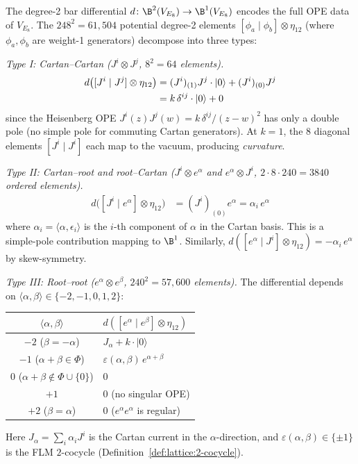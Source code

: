 \begin{computation}
\label{comp:E8-bar-deg2}
The degree-2 bar differential $d\colon \B^2(V_{E_8}) \to \B^1(V_{E_8})$
encodes the full OPE data of $V_{E_8}$. The $248^2 = 61{,}504$
potential degree-2 elements $[\phi_a \mid \phi_b] \otimes \eta_{12}$
(where $\phi_a, \phi_b$ are weight-1 generators) decompose into
three types:

\emph{Type I: Cartan--Cartan ($J^i \otimes J^j$, $8^2 = 64$ elements).}
\begin{align}
d\bigl([J^i \mid J^j] \otimes \eta_{12}\bigr)
&= (J^i)_{(1)}J^j \cdot |0\rangle + (J^i)_{(0)}J^j \notag \\
&= k\,\delta^{ij} \cdot |0\rangle + 0
\label{eq:E8-cartan-cartan}
\end{align}
since the Heisenberg OPE $J^i(z) J^j(w) = k\,\delta^{ij}/(z-w)^2$
has only a double pole (no simple pole for commuting Cartan generators).
At $k = 1$, the $8$ diagonal elements $[J^i \mid J^i]$ each
map to the vacuum, producing \emph{curvature}.

\emph{Type II: Cartan--root and root--Cartan
($J^i \otimes e^\alpha$ and $e^\alpha \otimes J^i$,
$2\cdot 8 \cdot 240 = 3840$ ordered elements).}
\begin{align}
d\bigl([J^i \mid e^\alpha] \otimes \eta_{12}\bigr)
&= (J^i)_{(0)}e^\alpha = \alpha_i \, e^\alpha
\label{eq:E8-cartan-root}
\end{align}
where $\alpha_i = \langle \alpha, \epsilon_i \rangle$ is the $i$-th
component of $\alpha$ in the Cartan basis. This is a simple-pole
contribution mapping to $\B^1$. Similarly,
$d([e^\alpha \mid J^i] \otimes \eta_{12}) = -\alpha_i\, e^\alpha$
by skew-symmetry.

\emph{Type III: Root--root ($e^\alpha \otimes e^\beta$,
$240^2 = 57{,}600$ elements).}
The differential depends on
$\langle \alpha, \beta \rangle \in \{-2, -1, 0, 1, 2\}$:
\begin{center}
\renewcommand{\arraystretch}{1.2}
\begin{tabular}{cl}
$\langle \alpha, \beta \rangle$ & $d([e^\alpha \mid e^\beta] \otimes \eta_{12})$ \\
\hline
$-2$ \;($\beta = -\alpha$) &
 $J_\alpha + k \cdot |0\rangle$ \\
$-1$ \;($\alpha + \beta \in \Phi$) &
 $\varepsilon(\alpha,\beta)\, e^{\alpha+\beta}$ \\
$0$ \;($\alpha + \beta \notin \Phi \cup \{0\}$) & $0$ \\
$+1$ & $0$ \;(no singular OPE) \\
$+2$ \;($\beta = \alpha$) & $0$ \;($e^\alpha e^\alpha$ is regular)
\end{tabular}
\end{center}
Here $J_\alpha = \sum_i \alpha_i J^i$ is the Cartan current
in the $\alpha$-direction, and $\varepsilon(\alpha,\beta) \in \{\pm 1\}$
is the FLM $2$-cocycle (Definition~\ref{def:lattice:2-cocycle}).


\end{computation}
